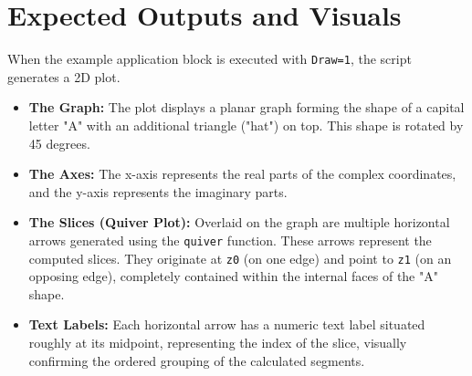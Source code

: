 \section{Expected Outputs and Visuals}
When the example application block is executed with \texttt{Draw=1}, the script generates a 2D plot.
\begin{itemize}
\item \textbf{The Graph:} The plot displays a planar graph forming the shape of a capital letter "A" with an additional triangle ("hat") on top. This shape is rotated by 45 degrees.
\item \textbf{The Axes:} The x-axis represents the real parts of the complex coordinates, and the y-axis represents the imaginary parts.
\item \textbf{The Slices (Quiver Plot):} Overlaid on the graph are multiple horizontal arrows generated using the \texttt{quiver} function. These arrows represent the computed slices. They originate at \texttt{z0} (on one edge) and point to \texttt{z1} (on an opposing edge), completely contained within the internal faces of the "A" shape.
\item \textbf{Text Labels:} Each horizontal arrow has a numeric text label situated roughly at its midpoint, representing the index of the slice, visually confirming the ordered grouping of the calculated segments.
\end{itemize}
